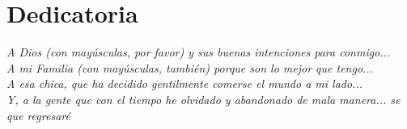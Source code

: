 \chapter*{Dedicatoria}


{\it A Dios (con mayúsculas, por favor) y sus buenas intenciones para conmigo...} \\[20mm]
{\it A mi Familia (con mayúsculas, también) porque son lo mejor que tengo...} \\[20mm]
{\it A esa chica, que ha decidido gentilmente comerse el mundo a mi lado...} \\[20mm]
{\it Y, a la gente que con el tiempo he olvidado y abandonado de mala manera... se que regresaré}\\[20mm]
